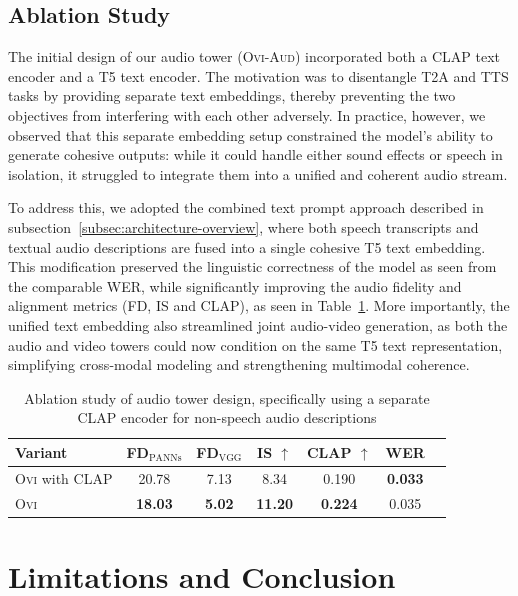 \documentclass{article} %
\begin{document}
\subsection{Ablation Study}

The initial design of our audio tower (\textsc{Ovi-Aud}) incorporated both a CLAP text encoder and a T5 text encoder. The motivation was to disentangle T2A and TTS tasks by providing separate text embeddings, thereby preventing the two objectives from interfering with each other adversely. In practice, however, we observed that this separate embedding setup constrained the model's ability to generate cohesive outputs: while it could handle either sound effects or speech in isolation, it struggled to integrate them into a unified and coherent audio stream.

To address this, we adopted the combined text prompt approach described in subsection~\ref{subsec:architecture-overview}, where both speech transcripts and textual audio descriptions are fused into a single cohesive T5 text embedding. This modification preserved the linguistic correctness of the model as seen from the comparable WER, while significantly improving the audio fidelity and alignment metrics (FD, IS and CLAP), as seen in Table~\ref{tab:ablation}. More importantly, the unified text embedding also streamlined joint audio-video generation, as both the audio and video towers could now condition on the same T5 text representation, simplifying cross-modal modeling and strengthening multimodal coherence.

\begin{table}[ht]
\centering
\caption{Ablation study of audio tower design, specifically using a separate CLAP encoder for non-speech audio descriptions}
\label{tab:ablation}
\begin{tabular}{lcccccc}
\toprule
Variant & FD$_{\text{PANNs}}$  & FD$_{\text{VGG}}$  & IS $\uparrow$ & CLAP $\uparrow$ & WER \\
\midrule
\textsc{Ovi} with CLAP        & 20.78 & 7.13 & 8.34 & 0.190 & \textbf{0.033} \\
\textsc{Ovi}                  & \textbf{18.03} & \textbf{5.02} & \textbf{11.20} & \textbf{0.224} & 0.035 \\
\bottomrule
\end{tabular}
\end{table}

\section{Limitations and Conclusion}
\end{document}
